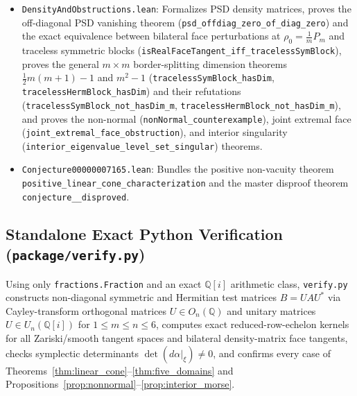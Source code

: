 \documentclass[11pt,a4paper]{article}
\theoremstyle{definition}
\theoremstyle{remark}
\newcommand{\QQ}{\mathbb{Q}}
\begin{document}
{\begin{itemize}
  \item \texttt{DensityAndObstructions.lean}: Formalizes PSD density matrices, proves the off-diagonal PSD vanishing theorem (\texttt{psd\_\allowbreak offdiag\_\allowbreak zero\_\allowbreak of\_\allowbreak diag\_\allowbreak zero}) and the exact equivalence between bilateral face perturbations at $\rho_0 = \frac{1}{m} P_m$ and traceless symmetric blocks (\texttt{isRealFaceTangent\_\allowbreak iff\_\allowbreak tracelessSymBlock}), proves the general $m \times m$ border-splitting dimension theorems $\frac{1}{2}m(m+1) - 1$ and $m^2 - 1$ (\texttt{tracelessSymBlock\_\allowbreak hasDim}, \texttt{tracelessHermBlock\_\allowbreak hasDim}) and their refutations (\texttt{tracelessSymBlock\_\allowbreak not\_\allowbreak hasDim\_m}, \texttt{tracelessHermBlock\_\allowbreak not\_\allowbreak hasDim\_m}), and proves the non-normal (\texttt{nonNormal\_\allowbreak counterexample}), joint extremal face (\texttt{joint\_\allowbreak extremal\_\allowbreak face\_\allowbreak obstruction}), and interior singularity (\texttt{interior\_\allowbreak eigenvalue\_\allowbreak level\_\allowbreak set\_\allowbreak singular}) theorems.
  \item \texttt{Conjecture00000007165.lean}: Bundles the positive non-vacuity theorem \texttt{positive\_\allowbreak linear\_\allowbreak cone\_\allowbreak characterization} and the master disproof theorem \texttt{conjecture\_\_\allowbreak disproved}.
\end{itemize}
\par}

\subsection{Standalone Exact Python Verification (\texttt{package/verify.py})}
Using only \texttt{fractions.Fraction} and an exact $\QQ[i]$ arithmetic class, \texttt{verify.py} constructs non-diagonal symmetric and Hermitian test matrices $B = U A U^*$ via Cayley-transform orthogonal matrices $U \in O_n(\QQ)$ and unitary matrices $U \in U_n(\QQ[i])$ for $1 \le m \le n \le 6$, computes exact reduced-row-echelon kernels for all Zariski/smooth tangent spaces and bilateral density-matrix face tangents, checks symplectic determinants $\det(d\alpha|_{\xi}) \neq 0$, and confirms every case of Theorems~\ref{thm:linear_cone}--\ref{thm:five_domains} and Propositions~\ref{prop:nonnormal}--\ref{prop:interior_morse}.
\end{document}

